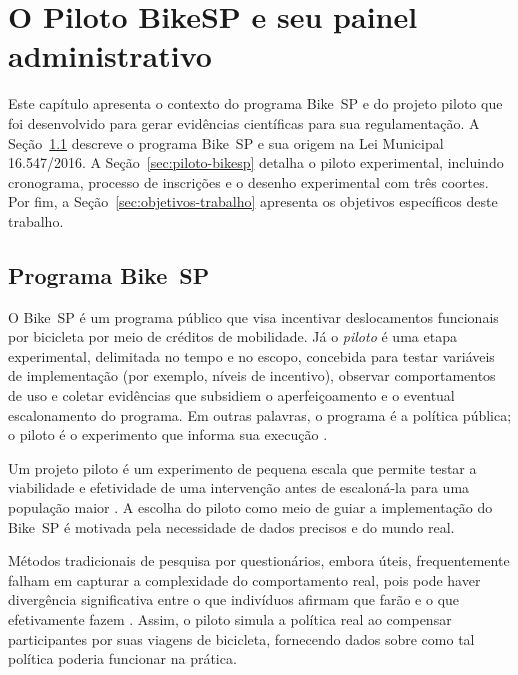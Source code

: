 
\chapter{O Piloto BikeSP e seu painel administrativo}
\label{cap:contexto-painel}

Este capítulo apresenta o contexto do programa Bike~SP e do projeto piloto que foi desenvolvido para gerar evidências científicas para sua regulamentação. A Seção~\ref{sec:programa-bikesp} descreve o programa Bike~SP e sua origem na Lei Municipal 16.547/2016. A Seção~\ref{sec:piloto-bikesp} detalha o piloto experimental, incluindo cronograma, processo de inscrições e o desenho experimental com três coortes. Por fim, a Seção~\ref{sec:objetivos-trabalho} apresenta os objetivos específicos deste trabalho.

\section{Programa Bike~SP}
\label{sec:programa-bikesp}
O Bike~SP é um programa público que visa incentivar deslocamentos funcionais por
bicicleta por meio de créditos de mobilidade. Já o \textit{piloto} é uma etapa
experimental, delimitada no tempo e no escopo, concebida para testar variáveis
de implementação (por exemplo, níveis de incentivo), observar comportamentos de
uso e coletar evidências que subsidiem o aperfeiçoamento e o eventual
escalonamento do programa. Em outras palavras, o programa é a política pública;
o piloto é o experimento que informa sua execução
\citep{faria2023:bikespCaseStudy, interscity:pilotoBikeSP}.

Um projeto piloto é um experimento de pequena escala que permite testar a
viabilidade e efetividade de uma intervenção antes de escaloná-la para uma
população maior \citep{pearson2020}. A escolha do piloto como meio de guiar a
implementação do Bike~SP é motivada pela necessidade de dados precisos e do
mundo real.

Métodos tradicionais de pesquisa por questionários, embora úteis, frequentemente
falham em capturar a complexidade do comportamento real, pois pode haver
divergência significativa entre o que indivíduos afirmam que farão e o que
efetivamente fazem \citep{rundle2009}. Assim, o piloto simula a política real ao
compensar participantes por suas viagens de bicicleta, fornecendo dados sobre
como tal política poderia funcionar na prática.

